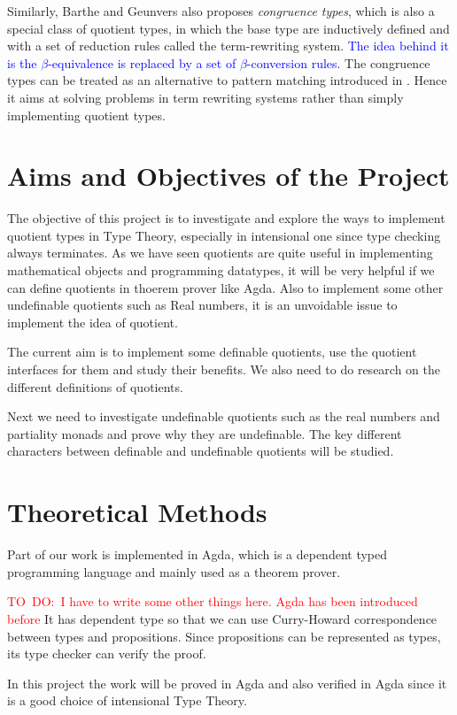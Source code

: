 \documentclass[envcountsame]{llncs}
\newcommand{\todo}[1]{\textcolor{red}{TO~DO:~#1}}
\newcommand{\ed}[1]{\textcolor{blue}{#1}}
\begin{document}
Similarly, Barthe and Geunvers \cite{bar:96} also proposes \emph{congruence types}, which is also a special class of quotient types, in which the base type are inductively defined and with a set of reduction rules called the term-rewriting system. \ed{The idea behind it is the $\beta$-equivalence is replaced by a set of $\beta$-conversion rules.} The congruence types can be treated as an alternative to pattern matching introduced in \cite{coq:92}.
Hence it aims at solving problems in term rewriting systems rather than simply implementing quotient types.


\section{Aims and Objectives of the Project}

The objective of this project is to investigate and explore the ways to
implement quotient types in Type Theory, especially in intensional
one since type checking always terminates.
As we have seen quotients are quite useful in implementing
mathematical objects and programming datatypes, it will be very
helpful if we can define quotients in thoerem prover like Agda. Also
to implement some other undefinable quotients such as Real numbers, it
is an unvoidable issue to implement the idea of quotient.

The current aim is to implement some definable quotients, use the
quotient interfaces for them and study their benefits. We also need to do
research on the different definitions of quotients.

Next we need to investigate undefinable quotients such as the real
numbers and partiality monads and prove why they are undefinable. The
key different characters between definable and undefinable quotients
will be studied. 


\section{Theoretical Methods}
Part of our work is implemented in Agda, which is a dependent typed
programming language and mainly used as a theorem prover.

\todo{I have to write some other things here. Agda has been introduced
before}
It has dependent type so that we can use Curry-Howard correspondence between types and propositions. Since propositions can be represented as types, its type checker can verify the proof.

In this project the work will be proved in Agda and also verified in Agda since it is a good choice of intensional Type Theory.
\end{document}
